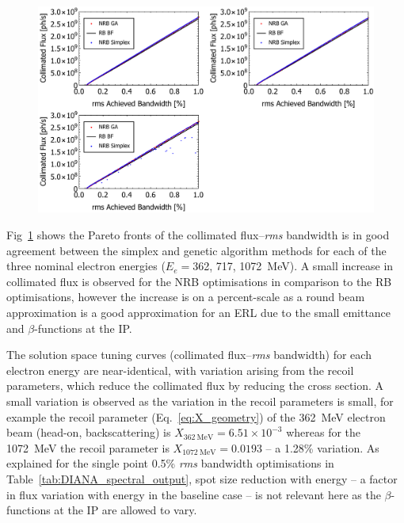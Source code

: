 \documentclass[../main.tex]{subfiles}
\begin{document}
\begin{figure}[!h]
\centering
\includegraphics[width=\textwidth]{Figures/DIANA_Inverse_Compton_Source_Design/DIANAFBW.pdf}
\caption{}
\label{fig:DIANA_FBW}
\end{figure}

Fig~\ref{fig:DIANA_FBW} shows the Pareto fronts of the collimated flux--\textit{rms} bandwidth is in good agreement between the simplex and genetic algorithm methods for each of the three nominal electron energies ($E_{e}= $362, 717, 1072~\si{\mega\electronvolt}). A small increase in collimated flux is observed for the NRB optimisations in comparison to the RB optimisations, however the increase is on a percent-scale as a round beam approximation is a good approximation for an ERL due to the small emittance and $\beta$-functions at the IP.

The solution space tuning curves (collimated flux--\textit{rms} bandwidth) for each electron energy are near-identical, with variation arising from the recoil parameters, which reduce the collimated flux by reducing the cross section. A small variation is observed as the variation in the recoil parameters is small, for example the recoil parameter (Eq.~\ref{eq:X_geometry}) of the 362~\si{\mega\electronvolt} electron beam (head-on, backscattering) is $X_{362~\si{\mega\electronvolt}}=6.51\times 10^{-3}$ whereas for the 1072~\si{\mega\electronvolt} the recoil parameter is $X_{1072~\si{\mega\electronvolt}}=0.0193$ -- a 1.28\% variation. As explained for the single point 0.5\% \textit{rms} bandwidth optimisations in Table~\ref{tab:DIANA_spectral_output}, spot size reduction with energy -- a factor in flux variation with energy in the baseline case -- is not relevant here as the $\beta$-functions at the IP are allowed to vary.
\end{document}
